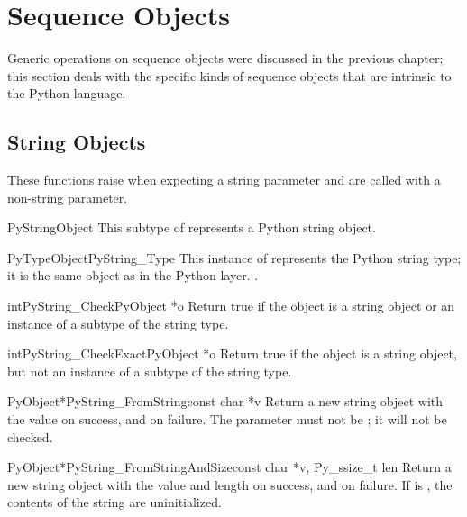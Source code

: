 \section{Sequence Objects \label{sequenceObjects}}

Generic operations on sequence objects were discussed in the previous
chapter; this section deals with the specific kinds of sequence
objects that are intrinsic to the Python language.


\subsection{String Objects \label{stringObjects}}

These functions raise  when expecting a string
parameter and are called with a non-string parameter.

\begin{ctypedesc}{PyStringObject}
  This subtype of  represents a Python string object.
\end{ctypedesc}

\begin{cvardesc}{PyTypeObject}{PyString_Type}
  This instance of  represents the Python string
  type; it is the same object as  in the Python
  layer.
  .
\end{cvardesc}

\begin{cfuncdesc}{int}{PyString_Check}{PyObject *o}
  Return true if the object  is a string object or an instance
  of a subtype of the string type.
\end{cfuncdesc}

\begin{cfuncdesc}{int}{PyString_CheckExact}{PyObject *o}
  Return true if the object  is a string object, but not an
  instance of a subtype of the string type.
\end{cfuncdesc}

\begin{cfuncdesc}{PyObject*}{PyString_FromString}{const char *v}
  Return a new string object with the value  on success, and
  \NULL{} on failure.  The parameter  must not be \NULL{}; it
  will not be checked.
\end{cfuncdesc}

\begin{cfuncdesc}{PyObject*}{PyString_FromStringAndSize}{const char *v,
                                                         Py_ssize_t len}
  Return a new string object with the value  and length
   on success, and \NULL{} on failure.  If  is
  \NULL{}, the contents of the string are uninitialized.
\end{cfuncdesc}


